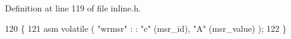 Definition at line 119 of file inline.\+h.


\begin{DoxyCode}
120 \{
121     \textcolor{keyword}{asm} \textcolor{keyword}{volatile} ( \textcolor{stringliteral}{"wrmsr"} : : \textcolor{stringliteral}{"c"} (msr\_id), \textcolor{stringliteral}{"A"} (msr\_value) );
122 \}
\end{DoxyCode}
